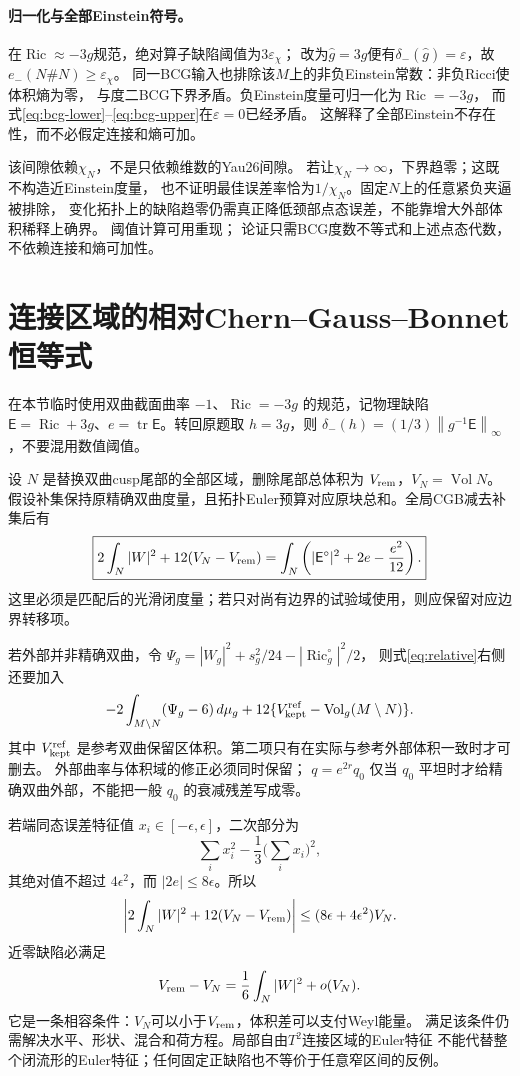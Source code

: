 \documentclass[UTF8,a4paper,11pt,fontset=fandol]{ctexart}
\numberwithin{equation}{section}
\theoremstyle{definition}
\newcommand{\Ric}{\operatorname{Ric}}
\newcommand{\Vol}{\operatorname{Vol}}
\newcommand{\tr}{\operatorname{tr}}
\newcommand{\dd}{\,d\mu_g}
\newcommand{\norm}[1]{\left\lVert#1\right\rVert}
\begin{document}
\paragraph{归一化与全部Einstein符号。}
在$\Ric\approx-3g$规范，绝对算子缺陷阈值为$3\varepsilon_\chi$；
改为$\widehat g=3g$便有$\delta_-(\widehat g)=\varepsilon$，故
$e_-(N\#N)\ge\varepsilon_\chi$。
同一BCG输入也排除该$M$上的非负Einstein常数：非负Ricci使体积熵为零，
与度二BCG下界矛盾。负Einstein度量可归一化为$\Ric=-3g$，
而式\eqref{eq:bcg-lower}--\eqref{eq:bcg-upper}在$\varepsilon=0$已经矛盾。
这解释了全部Einstein不存在性，而不必假定连接和熵可加。

该间隙依赖$\chi_N$，不是只依赖维数的Yau26间隙。
若让$\chi_N\to\infty$，下界趋零；这既不构造近Einstein度量，
也不证明最佳误差率恰为$1/\chi_N$。固定$N$上的任意紧负夹逼被排除，
变化拓扑上的缺陷趋零仍需真正降低颈部点态误差，不能靠增大外部体积稀释上确界。
阈值计算可用重现；
论证只需BCG度数不等式\cite{BCG}和上述点态代数，不依赖连接和熵可加性。

\section{连接区域的相对Chern--Gauss--Bonnet恒等式}
在本节临时使用双曲截面曲率 $-1$、$\Ric=-3g$ 的规范，记物理缺陷 $\mathsf E=\Ric+3g$、$e=\tr\mathsf E$。转回原题取 $h=3g$，则 $\delta_-(h)=(1/3)\norm{g^{-1}\mathsf E}_\infty$，不要混用数值阈值。

设 $N$ 是替换双曲cusp尾部的全部区域，删除尾部总体积为 $V_{\rm rem}$，$V_N=\Vol N$。假设补集保持原精确双曲度量，且拓扑Euler预算对应原块总和。全局CGB减去补集后有
\begin{equation}\label{eq:relative}
\boxed{
2\int_N|W|^2+12(V_N-V_{\rm rem})
=\int_N\left(|\mathsf E^\circ|^2+2e-\frac{e^2}{12}\right).}
\end{equation}
这里必须是匹配后的光滑闭度量；若只对尚有边界的试验域使用，则应保留对应边界转移项。

若外部并非精确双曲，令
$\Psi_g=|W_g|^2+s_g^2/24-|\Ric_g^\circ|^2/2$，
则式\eqref{eq:relative}右侧还要加入
\[
 -2\int_{M\setminus N}(\Psi_g-6)\dd
 +12\{V_{\rm kept}^{\rm ref}-\Vol_g(M\setminus N)\}.
\]
其中 $V_{\rm kept}^{\rm ref}$ 是参考双曲保留区体积。第二项只有在实际与参考外部体积一致时才可删去。
外部曲率与体积域的修正必须同时保留；
$q=e^{2r}q_0$ 仅当 $q_0$ 平坦时才给精确双曲外部，不能把一般 $q_0$ 的衰减残差写成零。

若端同态误差特征值 $x_i\in[-\epsilon,\epsilon]$，二次部分为
\[
\sum_i x_i^2-\frac13\Big(\sum_i x_i\Big)^2,
\]
其绝对值不超过 $4\epsilon^2$，而 $|2e|\le8\epsilon$。所以
\begin{equation}\label{eq:relativebound}
\left|2\int_N|W|^2+12(V_N-V_{\rm rem})\right|
\le(8\epsilon+4\epsilon^2)V_N.
\end{equation}
近零缺陷必满足
\[
V_{\rm rem}-V_N=\frac16\int_N|W|^2+o(V_N).
\]
它是一条相容条件：$V_N$可以小于$V_{\rm rem}$，体积差可以支付Weyl能量。
满足该条件仍需解决水平、形状、混合和荷方程。局部自由$T^2$连接区域的Euler特征
不能代替整个闭流形的Euler特征；任何固定正缺陷也不等价于任意窄区间的反例。
\end{document}
